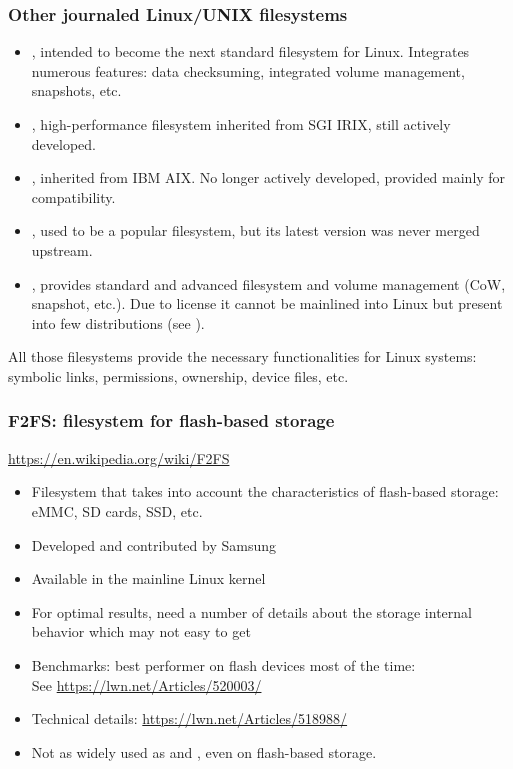 \begin{frame}
  \frametitle{Other journaled Linux/UNIX filesystems}
  \begin{itemize}
  \item {}, intended to become the next standard filesystem
    for Linux. Integrates numerous features: data checksuming,
    integrated volume management, snapshots, etc.
  \item {}, high-performance filesystem inherited from SGI
    IRIX, still actively developed.
  \item {}, inherited from IBM AIX. No longer actively
    developed, provided mainly for compatibility.
  \item {}, used to be a popular filesystem, but its
    latest version  was never merged upstream.
  \item {}, provides standard and advanced filesystem and
    volume management (CoW, snapshot, etc.). Due to license it
    cannot be mainlined into Linux but present into few distributions
    (see ).
  \end{itemize}
  All those filesystems provide the necessary functionalities for
  Linux systems: symbolic links, permissions, ownership, device files,
  etc.
\end{frame}

\begin{frame}
  \frametitle{F2FS: filesystem for flash-based storage}
  \url{https://en.wikipedia.org/wiki/F2FS}
  \begin{itemize}
  \item Filesystem that takes into account the characteristics of
    flash-based storage: eMMC, SD cards, SSD, etc.
  \item Developed and contributed by Samsung
  \item Available in the mainline Linux kernel
  \item For optimal results, need a number of details about the
    storage internal behavior which may not easy to get
  \item Benchmarks: best performer on flash devices most of the time: \\
        See \url{https://lwn.net/Articles/520003/}
  \item Technical details: \url{https://lwn.net/Articles/518988/}
  \item Not as widely used as  and , even on flash-based
    storage.
  \end{itemize}
\end{frame}

